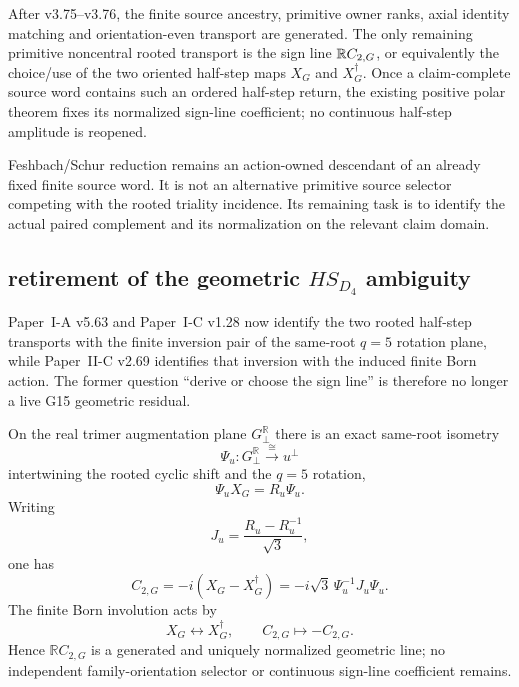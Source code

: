 \documentclass[11pt,a4paper]{article}
\begin{document}
\begin{corollary}
\label{p5:cor:v376-g15-halfstep-retyping}
After v3.75--v3.76, the finite source ancestry, primitive owner ranks, axial
identity matching and orientation-even transport are generated.  The only
remaining primitive noncentral rooted transport is the sign line
\(\mathbb{R} C_{2,G}\), or equivalently the choice/use of the two oriented
half-step maps \(X_G\) and \(X_G^\dagger\).  Once a claim-complete source word
contains such an ordered half-step return, the existing positive polar theorem
fixes its normalized sign-line coefficient; no continuous half-step amplitude
is reopened.
\end{corollary}

\begin{remark}
\label{p5:rem:v376-feshbach-downstream}
Feshbach/Schur reduction remains an action-owned descendant of an already
fixed finite source word.  It is not an alternative primitive source selector
competing with the rooted triality incidence.  Its remaining task is to
identify the actual paired complement and its normalization on the relevant
claim domain.
\end{remark}



\subsection{retirement of the geometric \texorpdfstring{$HS_{D_4}$}{HS-D4} ambiguity}
\label{p5:sec:v380-hsd4-retyping}

Paper~I-A v5.63 and Paper~I-C v1.28 now identify the two rooted half-step
transports with the finite inversion pair of the same-root $q=5$ rotation
plane, while Paper~II-C v2.69 identifies that inversion with the induced
finite Born action.  The former question ``derive or choose the sign line'' is
therefore no longer a live G15 geometric residual.

\begin{theorem}
\label{p5:thm:v380-hsd4-geometry-closed}
On the real trimer augmentation plane $G_\perp^{\mathbb R}$ there is an exact
same-root isometry
\[
 \Psi_u:G_\perp^{\mathbb R}\xrightarrow{\cong}u^\perp
\]
intertwining the rooted cyclic shift and the $q=5$ rotation,
\[
 \Psi_uX_G=R_u\Psi_u.
\]
Writing
\[
 J_u=\frac{R_u-R_u^{-1}}{\sqrt3},
\]
one has
\[
 \boxed{
 C_{2,G}=-i(X_G-X_G^\dagger)
 =-i\sqrt3\,\Psi_u^{-1}J_u\Psi_u.}
\]
The finite Born involution acts by
\[
 X_G\leftrightarrow X_G^\dagger,
 \qquad C_{2,G}\longmapsto-C_{2,G}.
\]
Hence $\mathbb RC_{2,G}$ is a generated and uniquely normalized geometric
line; no independent family-orientation selector or continuous sign-line
coefficient remains.
\end{theorem}
\end{document}
